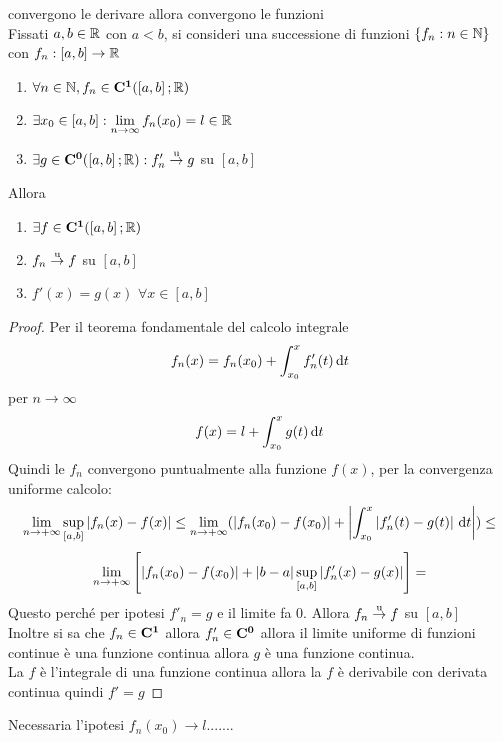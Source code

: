 \proposition convergono le derivare allora convergono le funzioni\\
Fissati $a,b\in \mathbb{R}$ con $a<b$, si consideri una successione di funzioni $\left\{f_n:n\in\mathbb{N}\right\}$ con $f_n:\left[a,b\right]\to \mathbb{R}$
\begin{enumerate}
	\item $\forall n\in\mathbb{N}, f_n\in \mathbf{C^{1}}(\left[a,b\right]; \mathbb{R})$
	\item $\exists x_0\in\left[a,b\right]: \lim\limits_{n\to\infty}f_n(x_0)=l\in \mathbb{R}$
	\item $\exists g \in \mathbf{C^{0}}(\left[a,b\right]; \mathbb{R}):f'_n \overset{\text{u}}{\to} g$ su $\left[a,b\right]$
\end{enumerate}
Allora
\begin{enumerate}
	\item $\exists f\in \mathbf{C^{1}}(\left[a,b\right]; \mathbb{R})$
	\item $f_n \overset{\text{u}}{\to} f$ su $\left[a,b\right]$
	\item $f'(x)=g(x)$ $\forall x\in\left[a,b\right]$
\end{enumerate}
\begin{proof}
	Per il teorema fondamentale del calcolo integrale
	\[f_n(x)=f_n(x_0)+\int_{x_0}^{x}f_n'(t)\,\mathrm{d}{t}\]
	per $n\to\infty$
	\[f(x)=l+\int_{x_0}^{x}g(t)\,\mathrm{d}{t}\]
	Quindi le $f_n$ convergono puntualmente alla funzione $f(x)$, per la convergenza uniforme calcolo:
	\[ \lim\limits_{n\to+\infty}\sup\limits_{\left[a,b\right]}\left|f_n(x)-f(x)\right| \leq \lim\limits_{n\to+\infty}(\left|f_n(x_0)-f(x_0)\right|+\left|\int_{x_0}^x \left|f_n'(t)-g(t)\right|\,\mathrm{d}{t}\right|) \leq \]
	\[\lim\limits_{n\to+\infty}\left[ \left|f_n(x_0)-f(x_0)\right|+\left|b-a\right|\sup\limits_{\left[a,b\right]}\left|f_n'(x)-g(x)\right| \right] = \]
	Questo perché per ipotesi $f'_n=g$ e il limite fa $0$.
	Allora $f_n \overset{\text{u}}{\to} f$ su $\left[a,b\right]$\\
	Inoltre si sa che $f_n\in \mathbf{C^{1}}$ allora $f_n'\in \mathbf{C^{0}}$ allora il limite uniforme di funzioni continue è una funzione continua allora $g$ è una funzione continua.\\
	La $f$ è l'integrale di una funzione continua allora la $f$ è derivabile con derivata continua quindi $f'=g$
\end{proof}
\observation
Necessaria l'ipotesi $f_n(x_0)\to l$.......

